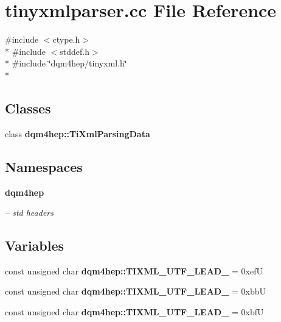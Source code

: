 \section{tinyxmlparser.\+cc File Reference}
\label{tinyxmlparser_8cc}
{\ttfamily \#include $<$ctype.\+h$>$}\\*
{\ttfamily \#include $<$stddef.\+h$>$}\\*
{\ttfamily \#include \char`\"{}dqm4hep/tinyxml.\+h\char`\"{}}\\*
\subsection*{Classes}
\begin{DoxyCompactItemize}
\item 
class {\bf dqm4hep\+::\+Ti\+Xml\+Parsing\+Data}
\end{DoxyCompactItemize}
\subsection*{Namespaces}
\begin{DoxyCompactItemize}
\item 
 {\bf dqm4hep}
\begin{DoxyCompactList}\small\item\em -- std headers \end{DoxyCompactList}\end{DoxyCompactItemize}
\subsection*{Variables}
\begin{DoxyCompactItemize}
\item 
const unsigned char {\bf dqm4hep\+::\+T\+I\+X\+M\+L\+\_\+\+U\+T\+F\+\_\+\+L\+E\+A\+D\+\_} = 0xef\+U
\item 
const unsigned char {\bf dqm4hep\+::\+T\+I\+X\+M\+L\+\_\+\+U\+T\+F\+\_\+\+L\+E\+A\+D\+\_} = 0xbb\+U
\item 
const unsigned char {\bf dqm4hep\+::\+T\+I\+X\+M\+L\+\_\+\+U\+T\+F\+\_\+\+L\+E\+A\+D\+\_} = 0xbf\+U
\end{DoxyCompactItemize}
